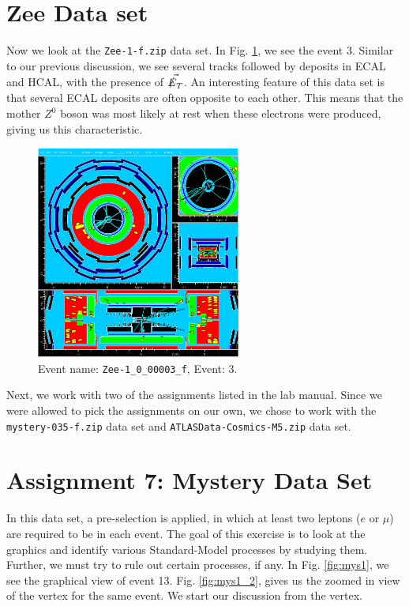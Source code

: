 \documentclass[a4paper]{report}
\numberwithin{equation}{section}
\begin{document}
\section{Zee Data set}

Now we look at the \texttt{Zee-1-f.zip} data set. In Fig. \ref{fig:zee}, we see the event 3. Similar to our previous discussion, we see several tracks followed by deposits in ECAL and HCAL, with the presence of $\vec{\slashed{E}_T}$. An interesting feature of this data set is that several ECAL deposits are often opposite to each other. This means that the mother $Z^0$ boson was most likely at rest when these electrons were produced, giving us this characteristic. 

\begin{figure}[htpb]
    \centering
    \includegraphics[width=0.6\textwidth]{Zee-1_0_00003_f-YX-RZ-RZ-YX-2022-05-23-13-23-32}
    \caption{Event name: \texttt{Zee-1\_0\_00003\_f}, Event: 3.}
    \label{fig:zee}
\end{figure}


Next, we work with two of the assignments listed in the lab manual. Since we were allowed to pick the assignments on our own, we chose to work with the \texttt{mystery-035-f.zip} data set and \texttt{ATLASData-Cosmics-M5.zip} data set. 

\section{Assignment 7: Mystery Data Set}  \label{subsec:mystery}
In this data set, a pre-selection is applied, in which at least two leptons ($e$ or $\mu$) are required to be in each event. The goal of this exercise is to look at the graphics and identify various Standard-Model processes by studying them. Further, we must try to rule out certain processes, if any. In Fig. \ref{fig:mys1}, we see the graphical view of event 13. Fig. \ref{fig:mys1_2}, gives us the zoomed in view of the vertex for the same event. We start our discussion from the vertex. 
\end{document}

